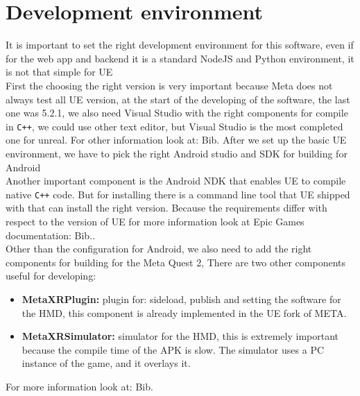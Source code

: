 \section{Development environment}
\noindent
It is important to set the right development environment for this software, even if for the web app and backend it is a standard NodeJS and Python environment, 
it is not that simple for \ac{UE}\\
First the choosing the right version is very important because Meta does not always test all \ac{UE} version, at the start of the developing of the software, the last one was 5.2.1,
we also need Visual Studio with the right components for compile in \texttt{C++}, we could use other text editor, but Visual Studio is the most completed one for unreal.
For other information look at: Bib.\cite{UEvisualStudio}
After we set up the basic \ac{UE} environment, we have to pick the right Android studio and \ac{SDK} for building for Android \\
Another important component is the Android \ac{NDK} that enables \ac{UE} to compile native \texttt{C++} code.
But for installing there is a command line tool that \ac{UE} shipped with that can install the right version. 
Because the requirements differ with respect to the version of \ac{UE} for more information look at Epic Games documentation: Bib.\cite{UEandroid}.\\
Other than the configuration for Android, we also need to add the right components for building for the Meta Quest 2,
There are two other components useful for developing:
\begin{itemize}
  \item \textbf{MetaXRPlugin:} plugin for: sideload, publish and setting the software for the \ac{HMD}, this component is already implemented in the \ac{UE} fork of META.
  \item \textbf{MetaXRSimulator:} simulator for the \ac{HMD}, this is extremely important because the compile time of the \ac{APK} is slow. The simulator uses a PC instance of the game, and it overlays it.
\end{itemize}
\noindent
For more information look at: Bib.\cite{MetaSetup}

